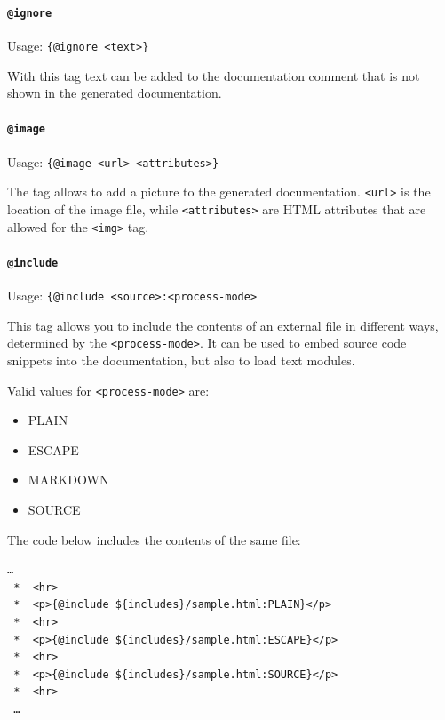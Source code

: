 
\paragraph{\lstinline|@ignore|}\label{sec:TagIgnore}  Usage: \lstinline|{@ignore <text>}|

With this tag text can be added to the documentation comment that is not shown in the generated documentation.


\paragraph{\lstinline|@image|}\label{sec:TagImage}  Usage: \lstinline|{@image <url> <attributes>}|

The tag allows to add a picture to the generated documentation. \texttt{<url>} is the location of the image file, while \texttt{<attributes>} are HTML attributes that are allowed for the \lstinline|<img>| tag.


\paragraph{\lstinline|@include|}\label{sec:TagInclude}  Usage: \lstinline|{@include <source>:<process-mode>|

This tag allows you to include the contents of an external file in different ways, determined by the \texttt{<process-mode>}. It can be used to embed source code snippets into the documentation, but also to load text modules. 

Valid values for \texttt{<process-mode>} are:
\begin{itemize}[nosep]
	\item PLAIN
	\item ESCAPE
	\item MARKDOWN
	\item SOURCE
\end{itemize}

The code below includes the contents of the same file:
\begin{lstlisting}[language=Comment]
 …
 *  <hr>
 *  <p>{@include ${includes}/sample.html:PLAIN}</p>
 *  <hr>
 *  <p>{@include ${includes}/sample.html:ESCAPE}</p>
 *  <hr>
 *  <p>{@include ${includes}/sample.html:SOURCE}</p>
 *  <hr>
 …
\end{lstlisting}

